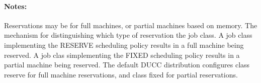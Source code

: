     \paragraph{Notes:}
    Reservations may be for full machines, or partial machines based on memory. The mechanism 
    for distinguishing which type of reservation the job class. A job class implementing the 
    RESERVE scheduling policy results in a full machine being reserved. A job clas simplementing 
    the FIXED scheduling policy results in a partial machine being reserved. The default DUCC 
    distribution configures class reserve for full machine reservations, and class fixed for partial 
    reservations. 


